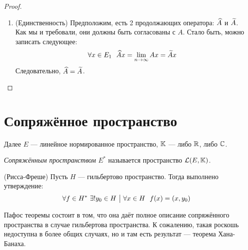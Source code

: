 \begin{proof}
\begin{enumerate}
		\item (Единственность) Предположим, есть 2 продолжающих оператора: $\widehat{A}$ и $\widetilde{A}$. Как мы и требовали, они должны быть согласованы с $A$. Стало быть, можно записать следующее:
		\[
			\forall x \in E_1\ \ \widehat{A}x = \lim_{n \to \infty} Ax = \widetilde{A}x
		\]
		Следовательно, $\widehat{A} = \widetilde{A}$.
	\end{enumerate}
\end{proof}

\section{Сопряжённое пространство}

\begin{note}
	Далее $E$ --- линейное нормированное пространство, $\mathbb{K}$ --- либо $\mathbb{R}$, либо $\mathbb{C}$.
\end{note}

\begin{definition}
	\textit{Сопряжённым пространством} $E^*$ называется пространство $\mathcal{L}(E, \mathbb{K})$.
\end{definition}

\begin{theorem} (Рисса-Фреше)
	Пусть $H$ --- гильбертово пространство. Тогда выполнено утверждение:
	\[
		\forall f \in H^*\ \exists! y_0 \in H \ \big|\  \forall x \in H\ \ f(x) = (x, y_0)
	\]
\end{theorem}

\begin{note}
	Пафос теоремы состоит в том, что она даёт полное описание сопряжённого пространства в случае гильбертова пространства. К сожалению, такая роскошь недоступна в более общих случаях, но и там есть результат --- теорема Хана-Банаха.
\end{note}

